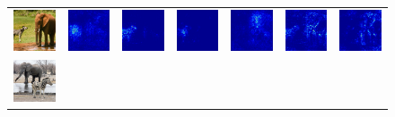 \begin{figure}
\begin{center}
\begin{tabular}{ccccccc}
\vspace{-2.5pt}
\includegraphics[width=0.14\linewidth,height=0.11\linewidth]{figs/examples/googlenet/soft/zeb-ele1} &
\includegraphics[width=0.14\linewidth,height=0.11\linewidth]{figs/examples/alexnet/soft/zeb-ele1_sali_341} &
\includegraphics[width=0.14\linewidth,height=0.11\linewidth]{figs/examples/vggnet/soft/zeb-ele1_sali_341} &
\includegraphics[width=0.14\linewidth,height=0.11\linewidth]{figs/examples/googlenet/soft/zeb-ele1_sali_341} &
\includegraphics[width=0.14\linewidth,height=0.11\linewidth]{figs/examples/alexnet/soft/zeb-ele1_sali_387} &
\includegraphics[width=0.14\linewidth,height=0.11\linewidth]{figs/examples/vggnet/soft/zeb-ele1_sali_387} &
\includegraphics[width=0.14\linewidth,height=0.11\linewidth]{figs/examples/googlenet/soft/zeb-ele1_sali_387} \\
\vspace{-2.5pt}
\includegraphics[width=0.14\linewidth,height=0.11\linewidth]{figs/examples/googlenet/soft/zeb-ele2} &

\end{tabular}
\end{center}
\end{figure}
